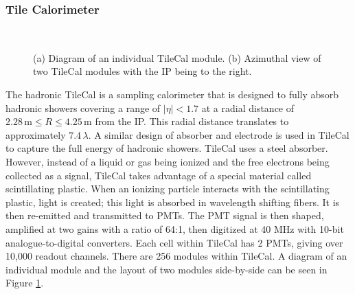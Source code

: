 		\subsubsection{Tile Calorimeter}\label{sssec:Tile}
			\begin{figure}[!ht]
			\centering
			 \\
			\caption{\label{fig:tile-modules} (a) Diagram of an individual \gls{TileCal} module. (b) Azimuthal view of two \gls{TileCal} modules with the \gls{IP} being to the right. \cite{ATLAS-tile}}
			\end{figure}
			The hadronic \gls{TileCal} is a sampling calorimeter that is designed to fully absorb hadronic showers covering a range of $|\eta|<1.7$ at a radial distance of $2.28 \, \mathrm{m} \leq R \leq 4.25 \, \mathrm{m}$ from the \gls{IP}. This radial distance translates to approximately $7.4\, \lambda$. A similar design of absorber and electrode is used in \gls{TileCal} to capture the full energy of hadronic showers. \gls{TileCal} uses a steel absorber. However, instead of a liquid or gas being ionized and the free electrons being collected as a signal, \gls{TileCal} takes advantage of a special material called scintillating plastic. When an ionizing particle interacts with the scintillating plastic, light is created; this light is absorbed in wavelength shifting fibers. It is then re-emitted and transmitted to \glspl{PMT}. The \gls{PMT} signal is then shaped, amplified at two gains with a ratio of 64:1, then digitized at 40 MHz with 10-bit analogue-to-digital converters. Each cell within \gls{TileCal} has 2 \glspl{PMT}, giving over 10,000 readout channels. There are 256 modules within \gls{TileCal}. A diagram of an individual module and the layout of two modules side-by-side can be seen in Figure \ref{fig:tile-modules}.
			

